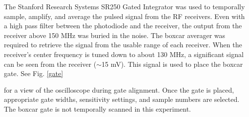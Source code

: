 The Stanford Research Systems SR250 Gated Integrator was used to temporally sample, amplify, and average the pulsed signal from the RF receivers. Even with a high pass filter between the photodiode and the receiver, the output from the receiver above 150 MHz was buried in the noise. The boxcar averager was required to retrieve the signal from the usable range of each receiver. When the receiver's center frequency is tuned down to about 130 MHz, a significant signal can be seen from the receiver ($\sim$15 mV). This signal is used to place the boxcar gate. See Fig. \ref{gate}

for a view of the oscilloscope during gate alignment. Once the gate is placed, appropriate gate widths, sensitivity settings, and sample numbers are selected. The boxcar gate is not temporally scanned in this experiment.

